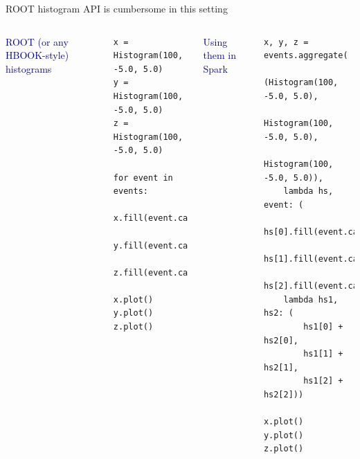 \documentclass[aspectratio=169]{beamer}
\begin{document}
\begin{frame}[fragile]{ROOT histogram API is cumbersome in this setting}
\vspace{0.5 cm}
\begin{columns}

\textcolor{darkblue}{ROOT (or any HBOOK-style) \mbox{histograms\hspace{-1 cm}}}
\small
\begin{verbatim}
x = Histogram(100, -5.0, 5.0)
y = Histogram(100, -5.0, 5.0)
z = Histogram(100, -5.0, 5.0)

for event in events:
    x.fill(event.calcX())
    y.fill(event.calcY())
    z.fill(event.calcZ())

x.plot()
y.plot()
z.plot()
\end{verbatim}

\textcolor{darkblue}{Using them in Spark}
\small
\begin{verbatim}
x, y, z = events.aggregate(
    (Histogram(100, -5.0, 5.0),
     Histogram(100, -5.0, 5.0),
     Histogram(100, -5.0, 5.0)),
    lambda hs, event: (
        hs[0].fill(event.calcX()),
        hs[1].fill(event.calcY()),
        hs[2].fill(event.calcZ())),
    lambda hs1, hs2: (
        hs1[0] + hs2[0],
        hs1[1] + hs2[1],
        hs1[2] + hs2[2]))

x.plot()
y.plot()
z.plot()
\end{verbatim}
\end{columns}
\end{frame}
\end{document}
